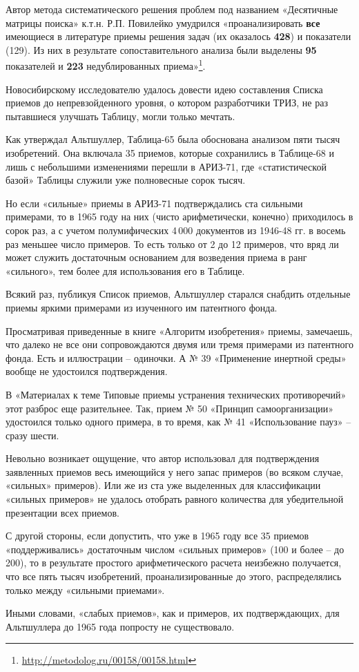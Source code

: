 \documentclass[11pt,a4paper]{article}
\begin{document}
Автор метода систематического решения проблем под названием «Десятичные
матрицы поиска» к.т.н. Р.П. Повилейко \cite{Povileiko1977} умудрился
«проанализировать \textbf{все} имеющиеся в литературе приемы решения задач (их
оказалось \textbf{428}) и показатели (129). Из них в результате
сопоставительного анализа были выделены \textbf{95} показателей и \textbf{223}
недублированных приема»\footnote{\url{http://metodolog.ru/00158/00158.html}}.

Новосибирскому исследователю удалось довести идею составления Списка приемов
до непревзойденного уровня, о котором разработчики ТРИЗ, не раз пытавшиеся
улучшать Таблицу, могли только мечтать.

Как утверждал Альтшуллер, Таблица-65 была обоснована анализом пяти тысяч
изобретений. Она включала 35 приемов, которые сохранились в Таблице-68 и лишь
с небольшими изменениями перешли в АРИЗ-71, где «статистической базой» Таблицы
служили уже полновесные сорок тысяч.

Но если «сильные» приемы в АРИЗ-71 подтверждались ста сильными примерами, то в
1965 году на них (чисто арифметически, конечно) приходилось в сорок раз, а с
учетом полумифических 4\,000 документов из 1946-48 гг. в восемь раз меньшее
число примеров. То есть только от 2 до 12 примеров, что вряд ли может служить
достаточным основанием для возведения приема в ранг «сильного», тем более для
использования его в Таблице.

Всякий раз, публикуя Список приемов, Альтшуллер старался снабдить отдельные
приемы яркими примерами из изученного им патентного фонда.

Просматривая приведенные в книге «Алгоритм изобретения» \cite{Altshuller1973}
приемы, замечаешь, что далеко не все они сопровождаются двумя или тремя
примерами из патентного фонда. Есть и иллюстрации -- одиночки. А № 39
«Применение инертной среды» вообще не удостоился подтверждения.

В «Материалах к теме Типовые приемы устранения технических противоречий»
\cite{Altshuller1973a} этот разброс еще разительнее. Так, прием № 50 «Принцип
самоорганизации» удостоился только одного примера, в то время, как № 41
«Использование пауз» -- сразу шести.

Невольно возникает ощущение, что автор использовал для подтверждения
заявленных приемов весь имеющийся у него запас примеров (во всяком случае,
«сильных» примеров). Или же из ста уже выделенных для классификации «сильных
примеров» не удалось отобрать равного количества для убедительной презентации
всех приемов.

С другой стороны, если допустить, что уже в 1965 году все 35 приемов
«поддерживались» достаточным числом «сильных примеров» (100 и более -- до
200), то в результате простого арифметического расчета неизбежно получается,
что все пять тысяч изобретений, проанализированные до этого, распределялись
только между «сильными приемами».

Иными словами, «слабых приемов», как и примеров, их подтверждающих, для
Альтшуллера до 1965 года попросту не существовало.


\end{document}
